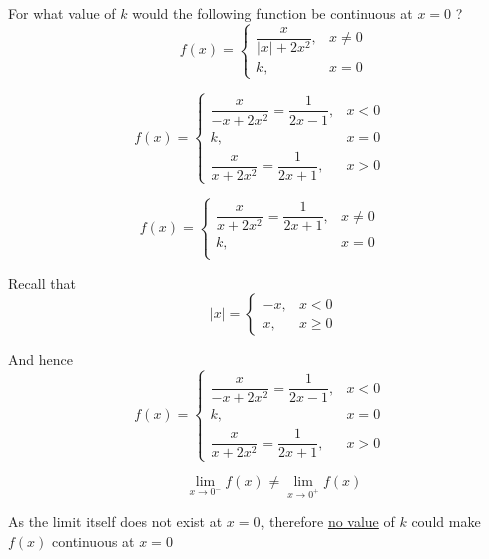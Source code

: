 \documentclass[14pt,fleqn]{extarticle}
\begin{document}
 
\begin{question}
	\statement 
    
    For what value of $k$ would the following function be continuous at $x=0$ ?
    \[ \qquad f(x) = \begin{cases}
    \dfrac{x}{\vert x\vert + 2x^2}, &x\neq 0 \\
    k,& x = 0
    \end{cases} \] 
    
    \begin{step}
  \begin{options} 
     \correct 
     \[f(x) = \begin{cases}
	\dfrac{x}{-x+2x^2} = \dfrac{1}{2x-1} , & x < 0\\
	k, & x = 0 \\
	\dfrac{x}{x+2x^2} = \dfrac{1}{2x+1}, & x > 0 
	
\end{cases}\]
     \incorrect
        
           \[f(x) = \begin{cases}
           \dfrac{x}{x+2x^2} = \dfrac{1}{2x+1}, & x \neq 0 \\
	k, & x = 0 \\
	
	
\end{cases}\]
    \end{options} 
     \reason 
     
     Recall that 
     \[ \qquad \vert x \vert = \begin{cases}
	-x, & x < 0\\
	x, & x\geq 0
\end{cases} \]

And hence 
     \[f(x) = \begin{cases}
	\dfrac{x}{-x+2x^2} = \dfrac{1}{2x-1} , & x < 0\\
	k, & x = 0 \\
	\dfrac{x}{x+2x^2} = \dfrac{1}{2x+1}, & x > 0 
	
\end{cases}\]
       
\end{step}

\begin{step}
  \begin{options} 
     \correct 
       
       \[ \qquad \lim_{x\to 0^-} f(x) \neq \lim_{x\to 0^+} f(x) \]
       
       As the limit itself does not exist at $x = 0$, therefore \underline{no value} of $k$ could make $f(x)$ continuous at $x = 0$
     \incorrect
     

\end{options}
\end{step}
\end{question}
\end{document}
